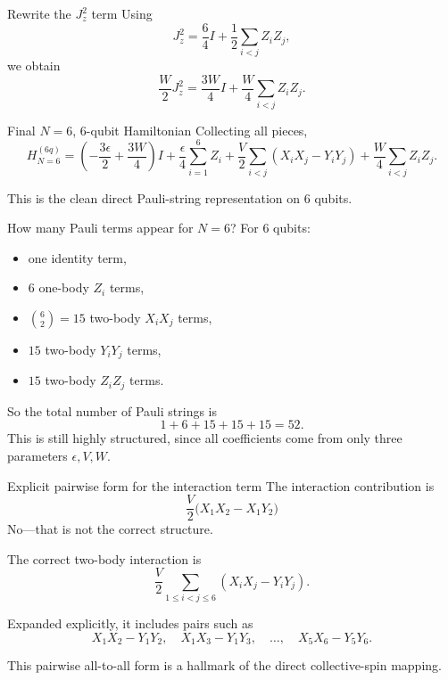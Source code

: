 \documentclass[aspectratio=169]{beamer}
\begin{document}
\begin{frame}{Rewrite the \(J_z^2\) term}
Using
\[
J_z^2
=
\frac{6}{4}I + \frac{1}{2}\sum_{i<j} Z_iZ_j,
\]
we obtain
\[
\frac{W}{2}J_z^2
=
\frac{3W}{4}I
+
\frac{W}{4}\sum_{i<j} Z_iZ_j.
\]
\end{frame}

\begin{frame}{Final \(N=6\), 6-qubit Hamiltonian}
Collecting all pieces,
\[
H_{N=6}^{(6q)}
=
\left(-\frac{3\epsilon}{2}+\frac{3W}{4}\right)I
+
\frac{\epsilon}{4}\sum_{i=1}^{6} Z_i
+
\frac{V}{2}\sum_{i<j}\left(X_iX_j-Y_iY_j\right)
+
\frac{W}{4}\sum_{i<j} Z_iZ_j.
\]

This is the clean direct Pauli-string representation on 6 qubits.
\end{frame}

\begin{frame}{How many Pauli terms appear for \(N=6\)?}
For 6 qubits:
\begin{itemize}
\item one identity term,
\item \(6\) one-body \(Z_i\) terms,
\item \(\binom{6}{2}=15\) two-body \(X_iX_j\) terms,
\item \(15\) two-body \(Y_iY_j\) terms,
\item \(15\) two-body \(Z_iZ_j\) terms.
\end{itemize}

So the total number of Pauli strings is
\[
1 + 6 + 15 + 15 + 15 = 52.
\]
This is still highly structured, since all coefficients come from only three parameters \(\epsilon,V,W\).
\end{frame}

\begin{frame}{Explicit pairwise form for the interaction term}
The interaction contribution is
\[
\frac{V}{2}
\Big(
X_1X_2-X_1Y_2
\Big)
\]
No---that is not the correct structure.

The correct two-body interaction is
\[
\frac{V}{2}\sum_{1\le i<j\le 6}
\left(X_iX_j-Y_iY_j\right).
\]

Expanded explicitly, it includes pairs such as
\[
X_1X_2-Y_1Y_2,\quad
X_1X_3-Y_1Y_3,\quad \dots,\quad
X_5X_6-Y_5Y_6.
\]

This pairwise all-to-all form is a hallmark of the direct collective-spin mapping.
\end{frame}
\end{document}
